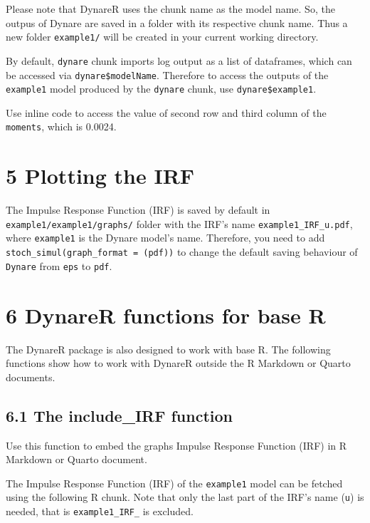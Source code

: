 \documentclass[
  12pt,
  legalpaperpaper,
  DIV=11,
  numbers=noendperiod]{scrartcl}
\begin{document}
Please note that DynareR uses the chunk name as the model name. So, the
outpus of Dynare are saved in a folder with its respective chunk name.
Thus a new folder \texttt{example1/} will be created in your current
working directory.

By default, \texttt{dynare} chunk imports log output as a list of
dataframes, which can be accessed via \texttt{dynare\$modelName}.
Therefore to access the outputs of the \texttt{example1} model produced
by the \texttt{dynare} chunk, use \texttt{dynare\$example1}.

Use inline code \texttt{} to access the value of second row and third
column of the \texttt{moments}, which is 0.0024.

\hypertarget{plotting-the-irf}{%
\section{5 Plotting the IRF}\label{plotting-the-irf}}

The Impulse Response Function (IRF) is saved by default in
\texttt{example1/example1/graphs/} folder with the IRF's name
\texttt{example1\_IRF\_u.pdf}, where \texttt{example1} is the Dynare
model's name. Therefore, you need to add
\texttt{stoch\_simul(graph\_format\ =\ (pdf))} to change the default
saving behaviour of \texttt{Dynare} from \texttt{eps} to \texttt{pdf}.

\hypertarget{dynarer-functions-for-base-r}{%
\section{6 DynareR functions for base
R}\label{dynarer-functions-for-base-r}}

The DynareR package is also designed to work with base R. The following
functions show how to work with DynareR outside the R Markdown or Quarto
documents.

\hypertarget{the-include_irf-function}{%
\subsection{6.1 The include\_IRF
function}\label{the-include_irf-function}}

Use this function to embed the graphs Impulse Response Function (IRF) in
R Markdown or Quarto document.

The Impulse Response Function (IRF) of the \texttt{example1} model can
be fetched using the following R chunk. Note that only the last part of
the IRF's name (\texttt{u}) is needed, that is \texttt{example1\_IRF\_}
is excluded.
\end{document}

